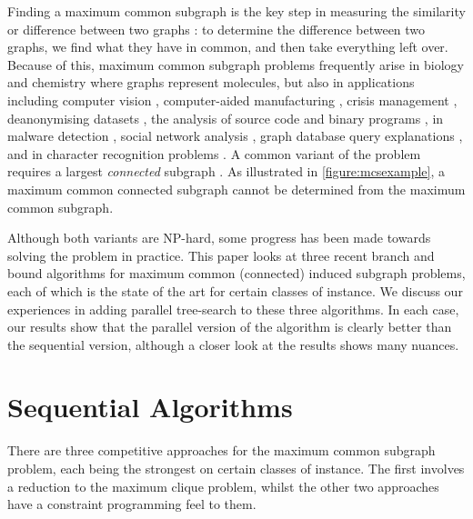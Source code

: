 \documentclass[sigconf]{acmart}
\begin{document}
Finding a maximum common subgraph is the key step in measuring the similarity or difference between
two graphs \citep{DBLP:journals/prl/Bunke97,DBLP:journals/prl/FernandezV01,o:Kriege15}: to determine
the difference between two graphs, we find what they have in common, and then take everything left
over. Because of this, maximum common subgraph problems frequently arise in biology and chemistry
\citep{DBLP:journals/jcamd/RaymondW02a,o:EhrlichR11,DBLP:journals/dam/GayFMSS14} where graphs
represent molecules, but also in applications including computer vision
\citep{DBLP:journals/jair/CookH94,DBLP:conf/gbrpr/CombierDS13}, computer-aided manufacturing
\citep{o:LuoWSN17}, crisis management \citep{o:DelavalladeFLL16}, deanonymising datasets
\citep{o:SharadD13}, the analysis of source code \citep{DBLP:journals/tkde/DjokoCH97} and binary
programs \citep{DBLP:conf/icics/GaoRS08}, in
malware detection \citep{DBLP:journals/compsec/ParkRS13}, social network analysis
\citep{DBLP:journals/tkde/FangYZZ15}, graph database query explanations
\citep{DBLP:journals/jcss/VasilyevaTBL16}, and in character recognition problems
\citep{DBLP:journals/pr/LuRS91}.  A common variant of the problem requires a largest
\emph{connected} subgraph
\citep{DBLP:journals/tcs/Koch01,DBLP:journals/jcamd/RaymondW02a,DBLP:conf/mco/VismaraV08,o:EhrlichR11,o:LuoWSN17}.
As illustrated in \cref{figure:mcsexample}, a maximum common connected subgraph cannot be determined
from the maximum common subgraph.

Although both variants are NP-hard, some progress has been made towards solving the problem in
practice.  This paper looks at three recent branch and bound algorithms for maximum common
(connected) induced subgraph problems, each of which is the state of the art for certain classes of
instance. We discuss our experiences in adding parallel tree-search to these three algorithms. In
each case, our results show that the parallel version of the algorithm is clearly better than the
sequential version, although a closer look at the results shows many nuances.

\section{Sequential Algorithms}

There are three competitive approaches for the maximum common subgraph problem, each being the
strongest on certain classes of instance. The first involves a reduction to the maximum clique
problem, whilst the other two approaches have a constraint programming feel to them.
\end{document}
